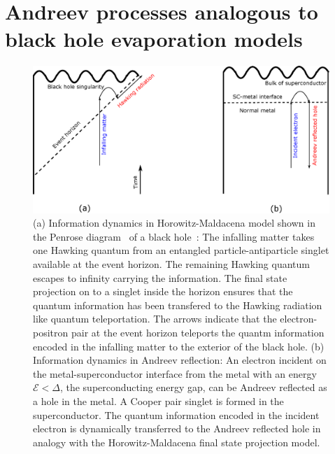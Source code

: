 \documentclass[10pt,letterpaper,aps,onecolumn,superscriptaddress,floatfix,notitlepage]{revtex4-1}
\begin{document}
	\section{Andreev processes analogous to black hole evaporation models\label{sec3}} 
	\begin{figure}
		\includegraphics[scale=0.4]{fig3.eps}
		\caption{(a) Information dynamics in Horowitz-Maldacena model shown in the Penrose diagram~\cite{penrose2011republication} of a black hole~\cite{projection,horowitz}: The infalling matter takes one Hawking quantum from an entangled particle-antiparticle singlet available at the event horizon. The remaining Hawking quantum escapes to infinity carrying the information. The final state projection on to a singlet inside the horizon ensures that the quantum information has been transfered to the Hawking radiation like quantum teleportation. The arrows indicate that the electron-positron pair at the event horizon teleports the quantm information  encoded in the infalling matter to the exterior of the black hole. (b) Information dynamics in Andreev reflection: An electron incident on the metal-superconductor interface from the metal with an energy $\mathcal{E} <\Delta$, the superconducting energy gap, can be Andreev reflected as a hole in the metal. A Cooper pair singlet is formed in the superconductor. The quantum information encoded in the incident electron is dynamically transferred to the Andreev reflected hole in analogy with the Horowitz-Maldacena final state projection model.\label{andreev}}
	\end{figure} 
	
\end{document}

